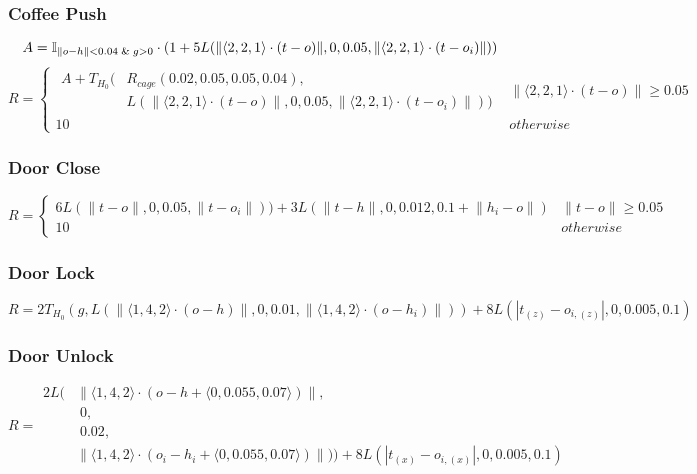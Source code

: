 {\subsubsection{Coffee Push}
\[
A=\mathbb{I}_{\lVert o - h \rVert < 0.04 \And g > 0} \cdot
    (1 + 5L(\lVert \langle2,2,1\rangle \cdot (t - o) \rVert, 0, 0.05, \lVert \langle2,2,1\rangle \cdot (t - o_i) \rVert))
\]
\[R=\left\{
\begin{array}{ll}
    \begin{aligned}
      A + T_{H_0}(
        & R_{cage}(0.02,0.05,0.05,0.04), \\
        & L(\lVert \langle2,2,1\rangle \cdot (t - o) \rVert, 0, 0.05, \lVert \langle2,2,1\rangle \cdot (t - o_i) \rVert))
        \end{aligned}
        & \lVert \langle2,2,1\rangle \cdot (t - o) \rVert\geq 0.05 \\
      10 & otherwise
\end{array} \right. \]

\subsubsection{Door Close}
\[R=\left\{
\begin{array}{ll}
    6L(\lVert t - o \rVert, 0, 0.05, \lVert t - o_i \rVert)) +
    3L(\lVert t - h \rVert, 0, 0.012, 0.1 + \lVert h_i - o \rVert)
    & \lVert t - o \rVert\geq 0.05 \\
      10 & otherwise
\end{array} \right. \]

\subsubsection{Door Lock}
\[
R=2T_{H_0}(
    g,
    L(\lVert \langle1,4,2\rangle \cdot (o - h) \rVert, 0, 0.01, \lVert \langle1,4,2\rangle \cdot (o - h_i) \rVert))
+ 8L(|t_{(z)} - o_{i,(z)}|, 0, 0.005, 0.1)
\]

\subsubsection{Door Unlock}
\[R=
\begin{aligned}
2L(&\lVert \langle1,4,2\rangle \cdot (o - h + \langle0, 0.055, 0.07\rangle) \rVert, \\ 
&\;0, \\ 
&\;0.02, \\ 
&\lVert \langle1,4,2\rangle \cdot (o_i - h_i + \langle0, 0.055, 0.07\rangle) \rVert)) + 
8L(|t_{(x)} - o_{i,(x)}|, 0, 0.005, 0.1)
\end{aligned}
\]

}
